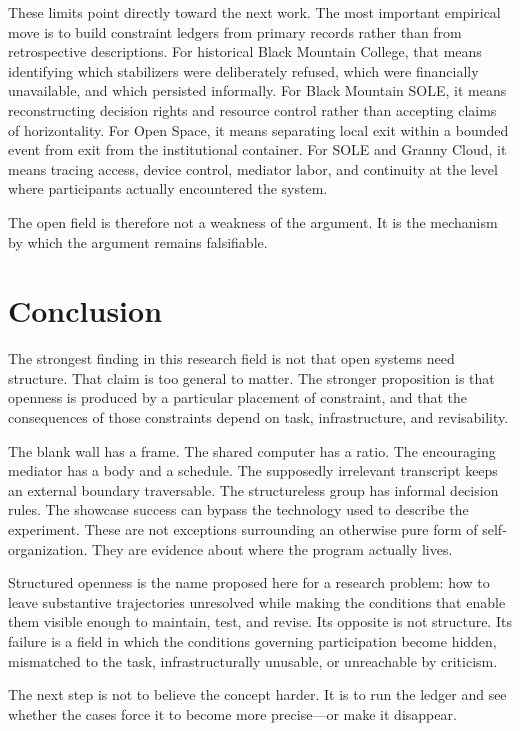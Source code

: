 \documentclass[11pt]{article}
\begin{document}
These limits point directly toward the next work. The most important empirical move is to build constraint ledgers from primary records rather than from retrospective descriptions. For historical Black Mountain College, that means identifying which stabilizers were deliberately refused, which were financially unavailable, and which persisted informally. For Black Mountain SOLE, it means reconstructing decision rights and resource control rather than accepting claims of horizontality. For Open Space, it means separating local exit within a bounded event from exit from the institutional container. For SOLE and Granny Cloud, it means tracing access, device control, mediator labor, and continuity at the level where participants actually encountered the system.

The open field is therefore not a weakness of the argument. It is the mechanism by which the argument remains falsifiable.

\section{Conclusion}
The strongest finding in this research field is not that open systems need structure. That claim is too general to matter. The stronger proposition is that openness is produced by a particular placement of constraint, and that the consequences of those constraints depend on task, infrastructure, and revisability.

The blank wall has a frame. The shared computer has a ratio. The encouraging mediator has a body and a schedule. The supposedly irrelevant transcript keeps an external boundary traversable. The structureless group has informal decision rules. The showcase success can bypass the technology used to describe the experiment. These are not exceptions surrounding an otherwise pure form of self-organization. They are evidence about where the program actually lives.

Structured openness is the name proposed here for a research problem: how to leave substantive trajectories unresolved while making the conditions that enable them visible enough to maintain, test, and revise. Its opposite is not structure. Its failure is a field in which the conditions governing participation become hidden, mismatched to the task, infrastructurally unusable, or unreachable by criticism.

The next step is not to believe the concept harder. It is to run the ledger and see whether the cases force it to become more precise—or make it disappear.
\end{document}
